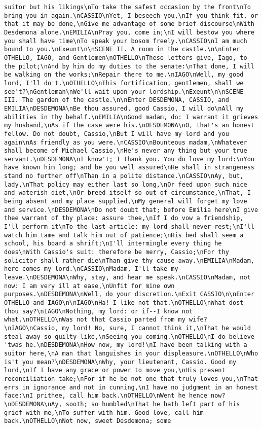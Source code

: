 \begin{verbatim}
suitor but his likings\nTo take the safest occasion by the front\nTo bring you in again.\nCASSIO\nYet, I beseech you,\nIf you think fit, or that it may be done,\nGive me advantage of some brief discourse\nWith Desdemona alone.\nEMILIA\nPray you, come in;\nI will bestow you where you shall have time\nTo speak your bosom freely.\nCASSIO\nI am much bound to you.\nExeunt\n\nSCENE II. A room in the castle.\n\nEnter OTHELLO, IAGO, and Gentlemen\nOTHELLO\nThese letters give, Iago, to the pilot;\nAnd by him do my duties to the senate:\nThat done, I will be walking on the works;\nRepair there to me.\nIAGO\nWell, my good lord, I'll do't.\nOTHELLO\nThis fortification, gentlemen, shall we see't?\nGentleman\nWe'll wait upon your lordship.\nExeunt\n\nSCENE III. The garden of the castle.\n\nEnter DESDEMONA, CASSIO, and EMILIA\nDESDEMONA\nBe thou assured, good Cassio, I will do\nAll my abilities in thy behalf.\nEMILIA\nGood madam, do: I warrant it grieves my husband,\nAs if the case were his.\nDESDEMONA\nO, that's an honest fellow. Do not doubt, Cassio,\nBut I will have my lord and you again\nAs friendly as you were.\nCASSIO\nBounteous madam,\nWhatever shall become of Michael Cassio,\nHe's never any thing but your true servant.\nDESDEMONA\nI know't; I thank you. You do love my lord:\nYou have known him long; and be you well assured\nHe shall in strangeness stand no further off\nThan in a polite distance.\nCASSIO\nAy, but, lady,\nThat policy may either last so long,\nOr feed upon such nice and waterish diet,\nOr breed itself so out of circumstance,\nThat, I being absent and my place supplied,\nMy general will forget my love and service.\nDESDEMONA\nDo not doubt that; before Emilia here\nI give thee warrant of thy place: assure thee,\nIf I do vow a friendship, I'll perform it\nTo the last article: my lord shall never rest;\nI'll watch him tame and talk him out of patience;\nHis bed shall seem a school, his board a shrift;\nI'll intermingle every thing he does\nWith Cassio's suit: therefore be merry, Cassio;\nFor thy solicitor shall rather die\nThan give thy cause away.\nEMILIA\nMadam, here comes my lord.\nCASSIO\nMadam, I'll take my leave.\nDESDEMONA\nWhy, stay, and hear me speak.\nCASSIO\nMadam, not now: I am very ill at ease,\nUnfit for mine own purposes.\nDESDEMONA\nWell, do your discretion.\nExit CASSIO\n\nEnter OTHELLO and IAGO\n\nIAGO\nHa! I like not that.\nOTHELLO\nWhat dost thou say?\nIAGO\nNothing, my lord: or if--I know not what.\nOTHELLO\nWas not that Cassio parted from my wife?\nIAGO\nCassio, my lord! No, sure, I cannot think it,\nThat he would steal away so guilty-like,\nSeeing you coming.\nOTHELLO\nI do believe 'twas he.\nDESDEMONA\nHow now, my lord!\nI have been talking with a suitor here,\nA man that languishes in your displeasure.\nOTHELLO\nWho is't you mean?\nDESDEMONA\nWhy, your lieutenant, Cassio. Good my lord,\nIf I have any grace or power to move you,\nHis present reconciliation take;\nFor if he be not one that truly loves you,\nThat errs in ignorance and not in cunning,\nI have no judgment in an honest face:\nI prithee, call him back.\nOTHELLO\nWent he hence now?\nDESDEMONA\nAy, sooth; so humbled\nThat he hath left part of his grief with me,\nTo suffer with him. Good love, call him back.\nOTHELLO\nNot now, sweet Desdemona; some 
\end{verbatim}
